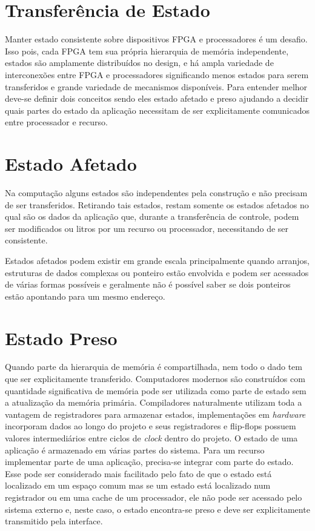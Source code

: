 \section{Transferência de Estado}
Manter estado consistente sobre dispositivos FPGA e processadores é um desafio. Isso pois, cada FPGA tem sua própria hierarquia de memória independente, estados são amplamente distribuídos no design, e há ampla variedade de interconexões entre FPGA e processadores significando menos estados para serem transferidos e grande variedade de mecanismos disponíveis. Para entender melhor deve-se definir dois conceitos sendo eles estado afetado e preso ajudando a decidir quais partes do estado da aplicação necessitam de ser explicitamente comunicados entre processador e recurso.

\section{Estado Afetado}
Na computação alguns estados são independentes pela construção e não precisam de ser transferidos. Retirando tais estados, restam somente os estados afetados no qual são os dados da aplicação que, durante a transferência de controle, podem ser modificados ou litros por um recurso ou processador, necessitando de ser consistente.

Estados afetados podem existir em grande escala principalmente quando arranjos, estruturas de dados complexas ou ponteiro estão envolvida e podem ser acessados de várias formas possíveis e geralmente não é possível saber se dois ponteiros estão apontando para um mesmo endereço.

\section{Estado Preso}
Quando parte da hierarquia de memória é compartilhada, nem todo o dado tem que ser explicitamente transferido. Computadores modernos são construídos com quantidade significativa de memória pode ser utilizada como parte de estado sem a atualização da memória primária. Compiladores naturalmente utilizam toda a vantagem de registradores para armazenar estados, implementações em \textit{hardware} incorporam dados ao longo do projeto e seus registradores e flip-flops possuem valores intermediários entre ciclos de \textit{clock} dentro do projeto. O estado de uma aplicação é armazenado em várias partes do sistema. Para um recurso implementar parte de uma aplicação, precisa-se integrar com parte do estado. Esse pode ser considerado mais facilitado pelo fato de que o estado está localizado em um espaço comum mas se um estado está localizado num registrador ou em uma cache de um processador, ele não pode ser acessado pelo sistema externo e, neste caso, o estado encontra-se preso e deve ser explicitamente transmitido pela interface.

